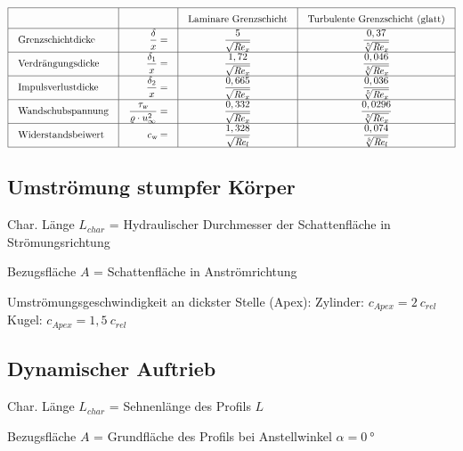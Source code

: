 	\[ \arraycolsep=1em\def\arraystretch{1.7}
	\begin{array}{|l|r|c|c|}
		\hline
		\quad                     & \quad                                                    & \text{Laminare Grenzschicht}  & \text{Turbulente Grenzschicht (glatt)} \\ \hline
		\text{Grenzschichtdicke}  & \dfrac{\delta}{x}                                      = & \dfrac{5}{\sqrt{\Reyn_x}}     & \dfrac{0,37}{\sqrt[5]{\Reyn_x}}        \\ \hline
		\text{Verdrängungsdicke}  & \dfrac{\delta_1}{x}                                    = & \dfrac{1,72}{\sqrt{\Reyn_x}}  & \dfrac{0,046}{\sqrt[5]{\Reyn_x}}       \\ \hline
		\text{Impulsverlustdicke} & \dfrac{\delta_2}{x}                                    = & \dfrac{0,665}{\sqrt{\Reyn_x}} & \dfrac{0,036}{\sqrt[5]{\Reyn_x}}       \\ \hline
		\text{Wandschubspannung}  & \dfrac{\tau_{\textsl{w}}}{\varrho \cdot u^2_{\infty}}  = & \dfrac{0,332}{\sqrt{\Reyn_x}} & \dfrac{0,0296}{\sqrt[5]{\Reyn_x}}      \\ \hline
		\text{Widerstandsbeiwert} & c_{\textsl{w}}                                         = & \dfrac{1,328}{\sqrt{\Reyn_l}} & \dfrac{0,074}{\sqrt[5]{\Reyn_l}}       \\ \hline
	\end{array} \]

	\clearpage
\subsection{Umströmung stumpfer Körper}
	\begin{doublespace}
		Char. Länge $ L_{char} $ = Hydraulischer Durchmesser der Schattenfläche in Strömungsrichtung

		Bezugsfläche $ A $ = Schattenfläche in Anströmrichtung

		Umströmungsgeschwindigkeit an dickster Stelle (Apex): Zylinder: $ c_{Apex}= 2\ c_{rel} $\quad Kugel: $ c_{Apex}= 1,5\ c_{rel}  $
	\end{doublespace}
	\vspace{-0.8em}
\subsection{Dynamischer Auftrieb}
	\begin{doublespace}
		Char. Länge $ L_{char} $ = Sehnenlänge des Profils $ L $

		Bezugsfläche $ A $ = Grundfläche des Profils bei Anstellwinkel $ \alpha = \qty{0}{\degree} $
	\end{doublespace}

